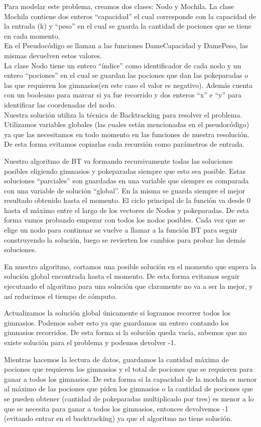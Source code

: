 \documentclass[spanish,12pt]{article}
\begin{document}
Para modelar este problema, creamos dos clases: Nodo y Mochila.
La clase Mochila contiene dos enteros ``capacidad'' el cual corresponde con la capacidad de la entrada (k) y ``peso'' en el cual se guarda la cantidad de pociones que se tiene en cada momento. 
\\
En el Pseudocódigo se llaman a las funciones DameCapacidad y DamePeso, las mismas devuelven estos valores.
\\
La clase Nodo tiene  un entero ``índice'' como identificador de cada nodo y un entero ``pociones'' en el cual se guardan las pociones que dan las pokeparadas o las que requieren los gimnasios(en este caso el valor es negativo). Además cuenta con un booleano para marcar si ya fue recorrido y dos enteros ``x'' e ``y'' para identificar las coordenadas del nodo.
\\
Nuestra solución utiliza la técnica de Backtracking para resolver el problema. Utilizamos variables globales (las cuales están mencionadas en el pseudocódigo) ya que las necesitamos en todo momento en las funciones de nuestra resolución. De esta forma evitamos copiarlas cada recursión como parámetros de entrada.

Nuestro algoritmo de BT va formando recursivamente todas las soluciones posibles eligiendo gimnasios y pokeparadas siempre que esto sea posible. Estas soluciones ``parciales'' son guardadas en una variable que siempre es comparada con una variable de solución ``global''. En la misma se guarda siempre el mejor resultado obtenido hasta el momento. El ciclo principal de la función va desde 0 hasta el máximo entre el largo de los vectores de Nodos y pokeparadas. De esta forma vamos probando empezar con todos los nodos posibles. Cada vez que se elige un nodo para continuar se vuelve a llamar a la función BT para seguir construyendo la solución, luego se revierten los cambios para probar las demás soluciones. 

En nuestro algoritmo, cortamos una posible solución en el momento que supera la solución global encontrada hasta el momento. De esta forma evitamos seguir ejecutando el algoritmo para una solución que claramente no va a ser la mejor, y así reducimos el tiempo de cómputo.

Actualizamos la solución global únicamente si logramos recorrer todos los gimnasios. Podemos saber esto ya que guardamos un entero contando los gimnasios recorridos. De esta forma si la solución queda vacía, sabemos que no existe solución para el problema y podemos devolver -1.

Mientras hacemos la lectura de datos, guardamos la cantidad máxima de pociones que requieren los gimnasios y el total de pociones que se requieren para ganar a todos los gimnasios. De esta forma si la capacidad de la mochila es menor al máximo de las pociones que piden los gimnasios o la cantidad de pociones que se pueden obtener (cantidad de pokeparadas multiplicado por tres) es menor a lo que se necesita para ganar a todos los gimnasios, entonces devolvemos -1 (evitando entrar en el backtracking) ya que el algoritmo no tiene solución. 
\end{document}
